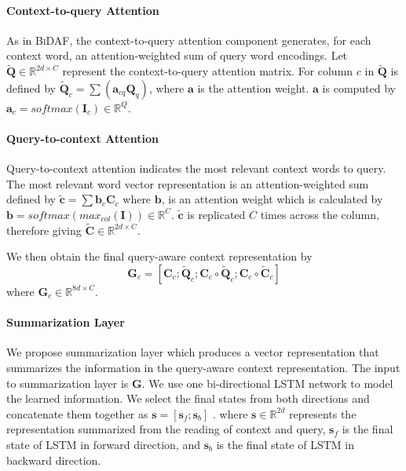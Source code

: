 \documentclass[11pt,letterpaper]{article}
\begin{document}
\paragraph{Context-to-query Attention}  As in \textsc{BiDAF}, the context-to-query attention component generates, for each context word, an attention-weighted sum of query word encodings. Let $\bm{\tilde{Q}} \in \mathbb{R}^{2d \times C}$ represent the context-to-query attention matrix. For column $c$ in $\bm{\tilde{Q}}$ is defined by $\bm{\tilde{Q}}_{c} = \sum(\bm{a}_{cq} \bm{Q}_{q})$, where $\bm{a}$ is the attention weight. $\bm{a}$ is computed by $\bm{a}_c = softmax(\bm{I}_{c}) \in \mathbb{R}^{Q}$. 

\paragraph{Query-to-context Attention} Query-to-context attention indicates the most relevant context words to query. The most relevant word vector representation is an attention-weighted sum defined by $\bm{\tilde{c}}=\sum{\bm{b}_c\bm{C}_{c}}$ where $\bm{b}$, is an attention weight which is calculated by $\bm{b} = softmax(max_{col}(\bm{I})) \in \mathbb{R}^{C}$. $\bm{\tilde{c}}$ is replicated $C$ times across the column, therefore giving $\bm{\tilde{C}}\in \mathbb{R}^{2d \times C}$.


We then obtain the final query-aware context representation by 
\begin{equation}
\bm{G}_{c} = [\bm{C}_{c};\bm{\tilde{Q}}_{c};\bm{C}_{c}\circ \bm{\tilde{Q}}_{c};\bm{C}_{c} \circ \bm{\tilde{C}}_{c}]
\end{equation}
where $\bm{G}_{c} \in \mathbb{R}^{8d \times C}$.



\paragraph{Summarization Layer} We propose summarization layer which produces a vector representation that summarizes the information in the query-aware context representation. The input to summarization layer is $\bm{G}$. We use one bi-directional LSTM network to model the learned information. We select the final states from both directions and concatenate them together as $\bm{s}=[\bm{s}_{f};\bm{s}_{b}]$ . where $\bm{s}\in \mathbb{R}^{2d}$ represents the representation summarized from the reading of context and query, $\bm{s}_{f}$ is the final state of LSTM in forward direction, and $\bm{s}_{b}$ is the final state of LSTM in backward direction. 
\end{document}
